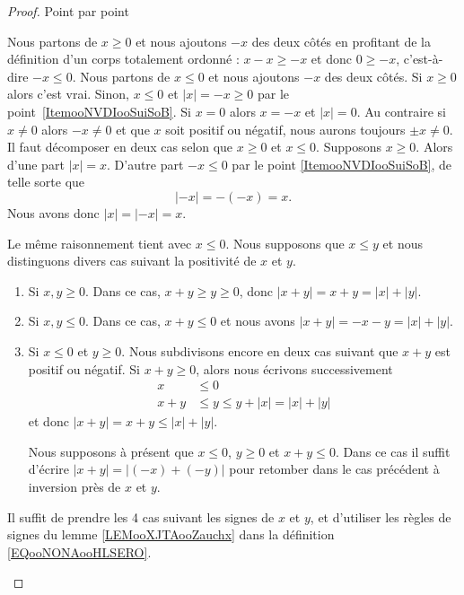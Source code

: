 \begin{proof}
	Point par point
	\begin{subproof}
		\spitem[\ref{ItemooNVDIooSuiSoB}]
		Nous partons de \( x\geq 0\) et nous ajoutons \( -x\) des deux côtés en profitant de la définition d'un corps totalement ordonné : \( x-x\geq -x\) et donc \( 0\geq-x\), c'est-à-dire \( -x\leq 0\).
		\spitem[\ref{ITEMooVNAZooSxmtuH}]
		Nous partons de \( x\leq 0\) et nous ajoutons \( -x\) des deux côtés.
		\spitem[\ref{ITEMooSDNHooDnjScE}]
		Si \( x\geq 0\) alors c'est vrai. Sinon, \( x\leq 0\) et \( | x |=-x\geq 0\) par le point~\ref{ItemooNVDIooSuiSoB}.
		\spitem[\ref{ITEMooLQLTooTJTPVM}]
		Si \( x=0\) alors \( x=-x\) et \( | x |=0\). Au contraire si \(x\neq 0\) alors \( -x\neq 0\) et que \( x\) soit positif ou négatif, nous aurons toujours \( \pm x\neq 0\).
		\spitem[\ref{ITEMooVJAEooOEatzY}]
		Il faut décomposer en deux cas selon que \( x\geq 0\) et \( x\leq 0\). Supposons \( x\geq 0\). Alors d'une part \( | x |=x\). D'autre part \( -x\leq 0\) par le point \ref{ItemooNVDIooSuiSoB}, de telle sorte que
		\begin{equation}
			| -x |=-(-x)=x.
		\end{equation}
		Nous avons donc \( | x |=| -x |=x\).

		Le même raisonnement tient avec \( x\leq 0\).
		\spitem[\ref{ItemooOMKNooRlanvk}]
		Nous supposons que \( x\leq y\) et nous distinguons divers cas suivant la positivité de \( x\) et \( y\).
		\begin{enumerate}
			\item
			      Si \( x,y\geq 0\). Dans ce cas, \( x+y\geq y\geq 0\), donc \( | x+y |=x+y=| x |+| y |\).
			\item
			      Si \( x,y\leq 0\). Dans ce cas, \( x+y\leq 0\) et nous avons \( | x+y |=-x-y=| x |+| y |\).
			\item
			      Si \( x\leq 0\) et \( y\geq 0\). Nous subdivisons encore en deux cas suivant que \( x+y\) est positif ou négatif. Si \( x+y\geq 0\), alors nous écrivons successivement
			      \begin{subequations}
				      \begin{align}
					      x   & \leq 0                         \\
					      x+y & \leq y\leq y+| x |=| x |+| y |
				      \end{align}
			      \end{subequations}
			      et donc \( | x+y |=x+y\leq | x |+| y |\).

			      Nous supposons à présent que \( x\leq 0\), \( y\geq 0\) et \( x+y\leq 0\). Dans ce cas il suffit d'écrire \( | x+y |=| (-x)+(-y) |\) pour retomber dans le cas précédent à inversion près de \( x\) et \( y\).
		\end{enumerate}
        Il suffit de prendre les 4 cas suivant les signes de \( x\) et \( y\), et d'utiliser les règles de signes du lemme \ref{LEMooXJTAooZauchx} dans la définition \ref{EQooNONAooHLSERO}.
	\end{subproof}
\end{proof}

